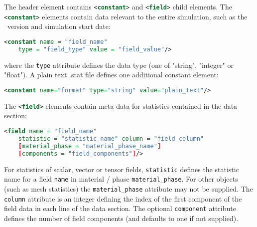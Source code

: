 The header element contains 
\lstinline[language = XML]*<constant>* and
\lstinline[language = XML]*<field>* child elements. The
\lstinline[language = XML]*<constant>* elements contain data relevant to the
entire simulation, such as the \fluidity\ version and simulation start date:

\begin{lstlisting}[language = XML]
  <constant name = "field_name"
    type = "field_type" value = "field_value"/>
\end{lstlisting}

where the \lstinline[language = XML]*type* attribute defines the data type
(one of "string", "integer" or "float"). A plain text .stat file defines one
additional constant element:

\begin{lstlisting}[language = XML]
<constant name="format" type="string" value="plain_text"/>
\end{lstlisting}

The \lstinline[language = XML]*<field>* elements contain meta-data for statistics
contained in the data section:

\begin{lstlisting}[language = XML]
  <field name = "field_name"
    statistic = "statistic_name" column = "field_column"
    [material_phase = "material_phase_name"]
    [components = "field_components"]/>
\end{lstlisting}

For statistics of scalar, vector or tensor fields, 
\lstinline[language = XML]*statistic* defines the statistic name for
a field \lstinline[language = XML]*name* in material / phase
\lstinline[language = XML]*material_phase*. For other objects (such as mesh
statistics) the \lstinline[language = XML]*material_phase* attribute may not
be supplied. The \lstinline[language = XML]*column* attribute is an integer defining the
index of the first component of the field data in each line of the data section.
The optional \lstinline[language = XML]*component* attribute defines the number
of field components (and defaults to one if not supplied). 

